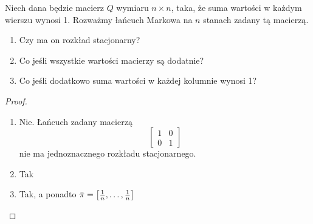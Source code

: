 \begin{exercise}
    Niech dana będzie macierz \( Q \) wymiaru \( n \times n \), taka, że suma wartości w każdym wierszu wynosi 1.
    Rozważmy łańcuch Markowa na \( n \) stanach zadany tą macierzą.
    
    \begin{enumerate}
        \item Czy ma on rozkład stacjonarny?
        \item Co jeśli wszystkie wartości macierzy są dodatnie?
        \item Co jeśli dodatkowo suma wartości w każdej kolumnie wynosi 1?
    \end{enumerate}
\end{exercise}
\begin{proof}
    \begin{enumerate}
        \item Nie.
        Łańcuch zadany macierzą
        \[
            \begin{bmatrix}
                1 & 0 \\
                0 & 1 
            \end{bmatrix}
        \]
        nie ma jednoznacznego rozkładu stacjonarnego.
        
        \item Tak
        
        \item Tak, a ponadto \( \bar \pi = \left[\frac{1}{n}, \dots, \frac{1}{n}\right] \)
    \end{enumerate}
\end{proof}